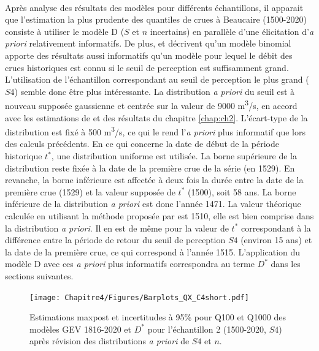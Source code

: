 	\paragraph{} Après analyse des résultats des modèles pour différents échantillons, il apparait que l'estimation la plus prudente des quantiles de crues à Beaucaire (1500-2020) consiste à utiliser le modèle D ($S$ et $n$ incertains) en parallèle d'une élicitation d'\textit{a priori} relativement informatifs. De plus, \citet{stedinger_flood_1986} et \citet{payrastre_usefulness_2011} décrivent qu'un modèle binomial apporte des résultats aussi informatifs qu'un modèle pour lequel le débit des crues historiques est connu si le seuil de perception est suffisamment grand. L'utilisation de l'échantillon correspondant au seuil de perception le plus grand ($S4$) semble donc être plus intéressante. La distribution \textit{a priori} du seuil est à nouveau supposée gaussienne et centrée sur la valeur de 9000 m\textsuperscript{3}/s, en accord avec les estimations de \citet{pichard_hydro-climatology_2017} et des résultats du chapitre \ref{chap:ch2}. L'écart-type de la distribution est fixé à 500 m\textsuperscript{3}/s, ce qui le rend l'\textit{a priori} plus informatif que lors des calculs précédents. En ce qui concerne la date de début de la période historique $t^{*}$, une distribution uniforme est utilisée. La borne supérieure de la distribution reste fixée à la date de la première crue de la série (en 1529). En revanche, la borne inférieure est affectée à deux fois la durée entre la date de la première crue (1529) et la valeur supposée de $t^{*}$ (1500), soit 58 ans. La borne inférieure de la distribution \textit{a priori} est donc l'année 1471. La valeur théorique calculée en utilisant la méthode proposée par \citet{prosdocimi_german_2018} est 1510, elle est bien comprise dans la distribution \textit{a priori}. Il en est de même pour la valeur de $t^{*}$ correspondant à la différence entre la période de retour du seuil de perception $S4$ (environ 15 ans) et la date de la première crue, ce qui correspond à l'année 1515. L'application du modèle D avec ces \textit{a priori} plus informatifs correspondra au terme $D^*$ dans les sections suivantes.

	\begin{figure}[h]
		\centering
		\texttt{[image: Chapitre4/Figures/Barplots\_QX\_C4short.pdf]}
		\caption{Estimations maxpost et incertitudes à 95\% pour Q100 et Q1000 des modèles GEV 1816-2020 et $D^*$ pour l'échantillon 2 (1500-2020, $S4$) après révision des distributions \textit{a priori} de $S4$ et $n$.}
		\label{fig:BarplotC4short}
	\end{figure}

